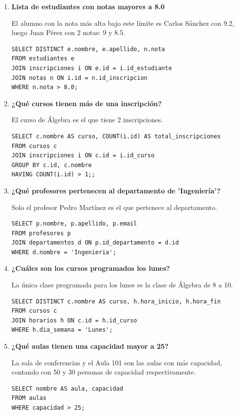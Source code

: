\documentclass[11pt,letterpaper]{article}
\begin{document}
\begin{enumerate}
    \item \textbf{Lista de estudiantes con notas mayores a 8.0}
    
    El alumno con la nota más alta bajo este límite es Carlos Sánchez con 9.2, luego Juan Pérez con 2 notas: 9 y 8.5.
\begin{lstlisting}
SELECT DISTINCT e.nombre, e.apellido, n.nota
FROM estudiantes e
JOIN inscripciones i ON e.id = i.id_estudiante
JOIN notas n ON i.id = n.id_inscripcion
WHERE n.nota > 8.0;
\end{lstlisting}

    \item \textbf{¿Qué cursos tienen más de una inscripción?}
    
    El curso de Álgebra es el que tiene 2 inscripciones.
\begin{lstlisting}
SELECT c.nombre AS curso, COUNT(i.id) AS total_inscripciones
FROM cursos c
JOIN inscripciones i ON c.id = i.id_curso
GROUP BY c.id, c.nombre
HAVING COUNT(i.id) > 1;;
\end{lstlisting}

    \item \textbf{¿Qué profesores pertenecen al departamento de 'Ingeniería'?}
    
    Solo el profesor Pedro Martínez es el que pertenece al departamento.
\begin{lstlisting}
SELECT p.nombre, p.apellido, p.email 
FROM profesores p
JOIN departamentos d ON p.id_departamento = d.id
WHERE d.nombre = 'Ingenieria';
\end{lstlisting}

    \item \textbf{¿Cuáles son los cursos programados los lunes?}
    
    La única clase programada para los lunes es la clase de Álgebra de 8 a 10.
\begin{lstlisting}
SELECT DISTINCT c.nombre AS curso, h.hora_inicio, h.hora_fin
FROM cursos c
JOIN horarios h ON c.id = h.id_curso
WHERE h.dia_semana = 'Lunes';
\end{lstlisting}

    \item \textbf{¿Qué aulas tienen una capacidad mayor a 25?}
    
    La sala de conferencias y el Aula 101 son las aulas con más capacidad, contando con 50 y 30 personas de capacidad respectivamente.
\begin{lstlisting}
SELECT nombre AS aula, capacidad 
FROM aulas
WHERE capacidad > 25;
\end{lstlisting}


\end{enumerate}
\end{document}
